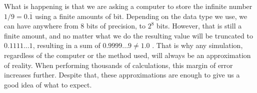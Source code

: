 What is happening is that we are asking a computer to store the infinite number $1/9 = 0.\overline{1}$ using a finite amounts of bit. Depending on the data type we use, we can have anywhere from 8 bits of precision, to $2^8$ bits. However, that is still a finite amount, and no matter what we do the resulting value will be truncated to $0.1111...1$, resulting in a sum of $0.9999...9 \neq 1.0$ . That is why any simulation, regardless of the computer or the method used, will always be an approximation of reality. When performing thousands of calculations, this margin of error increases further. Despite that, these approximations are enough to give us a good idea of what to expect.